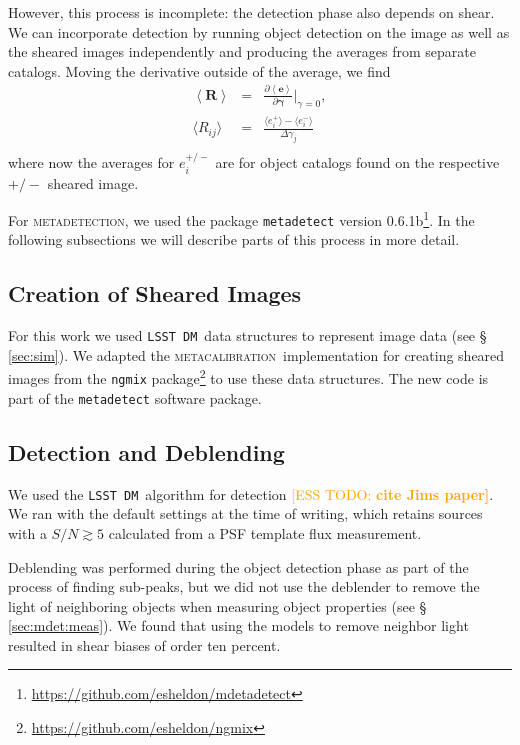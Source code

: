\documentclass[iop, twocolappendix, appendixfloats, numberedappendix, apj]{hackemulateapj}
\newcommand{\esstodo}[1]{\textcolor{orange}{[ESS TODO: \bf #1]}}
\newcommand{\dm}{\texttt{LSST DM}}
\newcommand{\mcal}{\textsc{metacalibration}}
\newcommand{\mdet}{\textsc{metadetection}}
\begin{document}
However, this process is incomplete:  the detection phase also depends on
shear.  We can incorporate detection by running object detection on the image
as well as the sheared images independently and producing the averages from
separate catalogs.  Moving the derivative outside of the average, we find
\begin{eqnarray} \label{eq:fullR}
    \left< \boldsymbol{R} \right> &=& \frac{\partial \left< \boldsymbol{e} \right> }{\partial \boldsymbol{\gamma} } \biggr\rvert_{\gamma=0},  \nonumber \\
    \langle R_{ij}\rangle &=& \frac{\langle e_i^{+}\rangle - \langle e_i^{-}\rangle}{\Delta\gamma_j} \nonumber \\
\end{eqnarray}
where now the averages for $e_i^{+/-}$ are for object catalogs found on the
respective ${+/-}$ sheared image.

For \mdet, we used the package \texttt{metadetect} version
0.6.1b\footnote{\url{https://github.com/esheldon/mdetadetect}}.  In the following subsections
we will describe parts of this process in more detail.

\subsection{Creation of Sheared Images} \label{sec:mdet:sheared}

For this work we used \dm\ data structures to represent image data (see \S
\ref{sec:sim}).  We adapted the \mcal\ implementation for creating sheared
images from the \texttt{ngmix}
package\footnote{\url{https://github.com/esheldon/ngmix}} to use these data
structures.  The new code is part of the \texttt{metadetect} software package.


\subsection{Detection and Deblending} \label{sec:mdet:detect}

We used the \dm\ algorithm for detection \esstodo{cite Jims paper}.  We ran with
the default settings at the time of writing, which retains sources with a
$S/N \gtrsim 5$ calculated from a PSF template flux measurement.

Deblending was performed during the object detection phase as part of the
process of finding sub-peaks, but we did not use the deblender to remove the
light of neighboring objects when measuring object properties (see \S
\ref{sec:mdet:meas}).  We found that using the models to remove neighbor light
resulted in shear biases of order ten percent.
\end{document}
